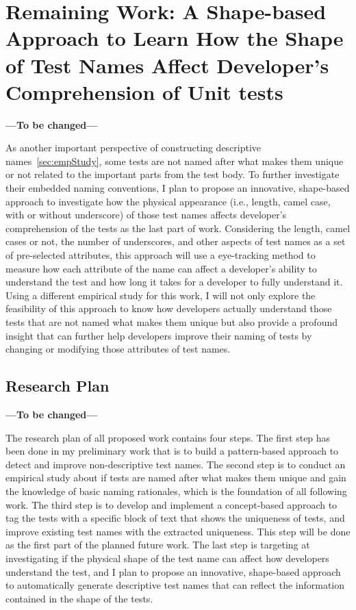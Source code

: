 \section{Remaining Work: A Shape-based Approach to Learn How the Shape of Test Names Affect Developer's Comprehension of Unit tests}
\label{sec:remaining-shape}

\textbf{---To be changed---}

As another important perspective of constructing descriptive names~\cref{sec:empStudy}, some tests are not named after what makes them unique or not related to the important parts from the test body.
%
To further investigate their embedded naming conventions, I plan to propose an innovative, shape-based approach to investigate how the physical appearance (i.e., length, camel case, with or without underscore) of those test names affects developer's comprehension of the tests as the last part of work.
%
Considering the length, camel cases or not, the number of underscores, and other aspects of test names as a set of pre-selected attributes, this approach will use a eye-tracking method to measure how each attribute of the name can affect a developer's ability to understand the test and how long it takes for a developer to fully understand it.
%
Using a different empirical study for this work, I will not only explore the feasibility of this approach to know how developers actually understand those tests that are not named what makes them unique but also provide a profound insight that can further help developers improve their naming of tests by changing or modifying those attributes of test names.

\subsection{Research Plan}

\textbf{---To be changed---}

The research plan of all proposed work contains four steps.
%
The first step has been done in my preliminary work that is to build a pattern-based approach to detect and improve non-descriptive test names.
%
The second step is to conduct an empirical study about if tests are named after what makes them unique and gain the knowledge of basic naming rationales, which is the foundation of all following work.
%
The third step is to develop and implement a concept-based approach to tag the tests with a specific block of text that shows the uniqueness of tests, and improve existing test names with the extracted uniqueness.
%
This step will be done as the first part of the planned future work.
%
The last step is targeting at investigating if the physical shape of the test name can affect how developers understand the test, and I plan to propose an innovative, shape-based approach to automatically generate descriptive test names that can reflect the information contained in the shape of the tests.